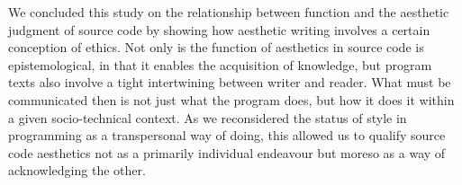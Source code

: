 We concluded this study on the relationship between function and the aesthetic judgment of source code by showing how aesthetic writing involves a certain conception of ethics. Not only is the function of aesthetics in source code is epistemological, in that it enables the acquisition of knowledge, but program texts also involve a tight intertwining  between writer and reader. What must be communicated then is not just what the program does, but how it does it within a given socio-technical context. As we reconsidered the status of style in programming as a transpersonal way of doing, this allowed us to qualify source code aesthetics not as a primarily individual endeavour but moreso as a way of acknowledging the other.

